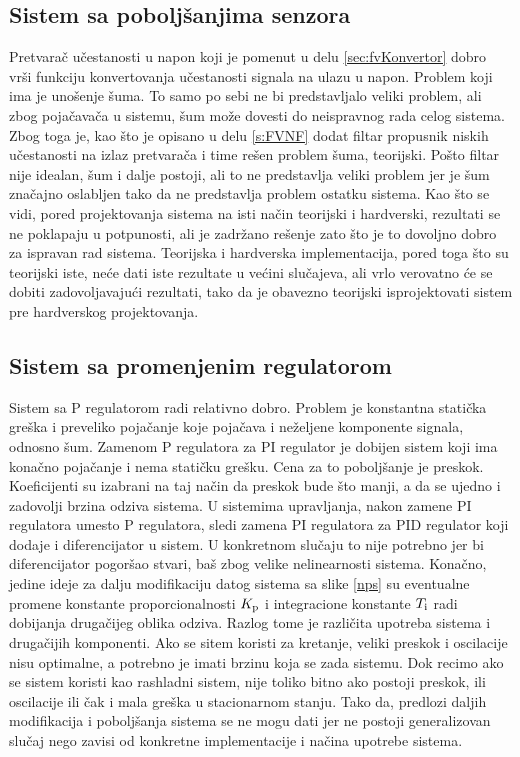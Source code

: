 \documentclass[a4paper, 12pt, diplomski]{etf}
\begin{document}
\subsection{Sistem sa poboljšanjima senzora}
Pretvarač učestanosti u napon koji je pomenut u delu \ref{sec:fvKonvertor} dobro vrši funkciju konvertovanja učestanosti signala na ulazu u napon. Problem koji ima je unošenje šuma. To samo po sebi ne bi predstavljalo veliki problem, ali zbog pojačavača u sistemu, šum može dovesti do neispravnog rada celog sistema. Zbog toga je, kao što je opisano u delu \ref{s:FVNF} dodat filtar propusnik niskih učestanosti na izlaz pretvarača i time rešen problem šuma, teorijski. Pošto filtar nije idealan, šum i dalje postoji, ali to ne predstavlja veliki problem jer je šum značajno oslabljen tako da ne predstavlja problem ostatku sistema. Kao što se vidi, pored projektovanja sistema na isti način teorijski i hardverski, rezultati se ne poklapaju u potpunosti, ali je zadržano rešenje zato što je to dovoljno dobro za ispravan rad sistema. Teorijska i hardverska implementacija, pored toga što su teorijski iste, neće dati iste rezultate u većini slučajeva, ali vrlo verovatno će se dobiti zadovoljavajući rezultati, tako da je obavezno teorijski isprojektovati sistem pre hardverskog projektovanja.

\subsection{Sistem sa promenjenim regulatorom} \label{s:sspr}


Sistem sa P regulatorom radi relativno dobro. Problem je konstantna statička greška i preveliko pojačanje koje pojačava i neželjene komponente signala, odnosno šum. Zamenom P regulatora za PI regulator je dobijen sistem koji ima konačno pojačanje i nema statičku grešku. Cena za to poboljšanje je preskok. Koeficijenti su izabrani na taj način da preskok bude što manji, a da se ujedno i zadovolji brzina odziva sistema. U sistemima upravljanja, nakon zamene PI regulatora umesto P regulatora, sledi zamena PI regulatora za PID regulator koji dodaje i diferencijator u sistem. U konkretnom slučaju to nije potrebno jer bi diferencijator pogoršao stvari, baš zbog velike nelinearnosti sistema. Konačno, jedine ideje za dalju modifikaciju datog sistema sa slike \ref{nps} su eventualne promene konstante proporcionalnosti $K_{\rm p}$ i integracione konstante $T_{\rm i}$ radi dobijanja drugačijeg oblika odziva. Razlog tome je različita upotreba sistema i drugačijih komponenti. Ako se sitem koristi za kretanje, veliki preskok i oscilacije nisu optimalne, a potrebno je imati brzinu koja se zada sistemu. Dok recimo ako se sistem koristi kao rashladni sistem, nije toliko bitno ako postoji preskok, ili oscilacije ili čak i mala greška u stacionarnom stanju. Tako da, predlozi daljih modifikacija i poboljšanja sistema se ne mogu dati jer ne postoji generalizovan slučaj nego zavisi od konkretne implementacije i načina upotrebe sistema.
\end{document}
